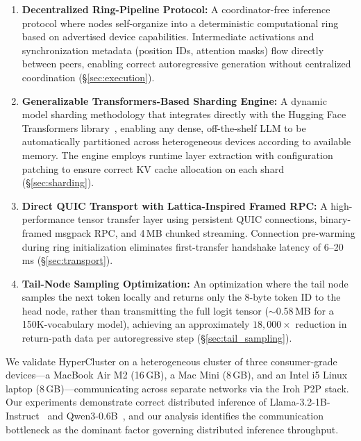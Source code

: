 \documentclass[runningheads]{llncs}
\begin{document}
\begin{enumerate}
    \item \textbf{Decentralized Ring-Pipeline Protocol:} A coordinator-free inference protocol where nodes self-organize into a deterministic computational ring based on advertised device capabilities. Intermediate activations and synchronization metadata (position IDs, attention masks) flow directly between peers, enabling correct autoregressive generation without centralized coordination (\S\ref{sec:execution}).

    \item \textbf{Generalizable Transformers-Based Sharding Engine:} A dynamic model sharding methodology that integrates directly with the Hugging Face Transformers library~\cite{wolf-etal-2020-transformers}, enabling any dense, off-the-shelf LLM to be automatically partitioned across heterogeneous devices according to available memory. The engine employs runtime layer extraction with configuration patching to ensure correct KV cache allocation on each shard (\S\ref{sec:sharding}).

    \item \textbf{Direct QUIC Transport with Lattica-Inspired Framed RPC:} A high-performance tensor transfer layer using persistent QUIC connections, binary-framed msgpack RPC, and 4\,MB chunked streaming. Connection pre-warming during ring initialization eliminates first-transfer handshake latency of 6--20\,ms (\S\ref{sec:transport}).

    \item \textbf{Tail-Node Sampling Optimization:} An optimization where the tail node samples the next token locally and returns only the 8-byte token ID to the head node, rather than transmitting the full logit tensor ($\sim$0.58\,MB for a 150K-vocabulary model), achieving an approximately $18{,}000\times$ reduction in return-path data per autoregressive step (\S\ref{sec:tail_sampling}).
\end{enumerate}

We validate HyperCluster on a heterogeneous cluster of three consumer-grade devices---a MacBook Air M2 (16\,GB), a Mac Mini (8\,GB), and an Intel i5 Linux laptop (8\,GB)---communicating across separate networks via the Iroh P2P stack. Our experiments demonstrate correct distributed inference of Llama-3.2-1B-Instruct~\cite{grattafiori2024llama} and Qwen3-0.6B~\cite{yang2025qwen3}, and our analysis identifies the communication bottleneck as the dominant factor governing distributed inference throughput.
\end{document}
